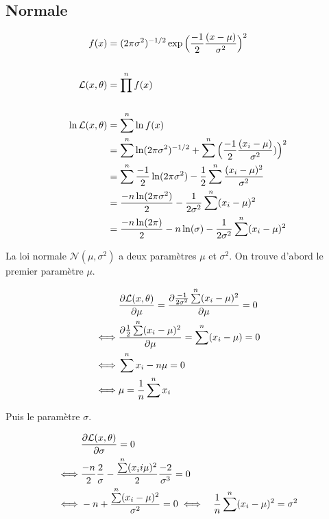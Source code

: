 \documentclass{article}
\begin{document}
\subsection{Normale}

\begin{align*}
        f(x) &= (2 \pi \sigma^2)^{-1/2} \exp\Big(\frac{-1}{2} \frac{(x-\mu)}{\sigma^2}\Big)^2 \\ \\
        {\cal L}(x, \theta) &= \prod\limits^n f(x) \\ \\
        \ln{\cal L}(x, \theta) &= \sum\limits^n \ln f(x) \\
        &= \sum\limits^n \ln(2 \pi \sigma^2)^{-1/2} + \sum\limits^n \Big(\frac{-1}{2} \frac{(x_i-\mu)}{\sigma^2})\Big)^2 \\
        &= \sum\limits^n \frac{- 1}{2} \ln(2 \pi \sigma^2) - \frac{1}{2} \sum\limits^n \frac{(x_i -\mu)^2}{\sigma^2} \\
        &= \frac{-n \ln(2 \pi \sigma^2)}{2} - \frac{1}{2 \sigma^2} \sum\limits^n (x_i - \mu)^2 \\
        &= \frac{-n \ln(2 \pi)}{2} - {n \ln(\sigma)} - \frac{1}{2 \sigma^2} \sum\limits^n (x_i - \mu)^2
\end{align*}

La loi normale $\mathcal{N}(\mu, \sigma^2)$ a deux paramètres $\mu$ et $\sigma^2$.
On trouve d'abord le premier paramètre $\mu$.

\begin{align*}
    &\frac{\partial \likelihood(x, \theta)}{\partial \mu} = \frac{\partial \frac{-1}{2 \sigma^2} \sum\limits^n (x_i - \mu)^2}{\partial \mu} = 0 \\
    \iff& \frac{\partial \frac{1}{2}\sum\limits^n (x_i-\mu)^2}{\partial \mu} = \sum\limits^n (x_i - \mu) = 0 \\
    \iff& \sum\limits^n x_i - n\mu = 0 \\
    \iff& \mu = \frac{1}{n} \sum\limits^n x_i
\end{align*}

Puis le paramètre $\sigma$.

\begin{align*}
    &\frac{\partial {\cal L}(x, \theta)}{\partial \sigma} = 0 \\
    \iff& \frac{-n}{2} \frac{2}{\sigma} - \frac{\sum\limits^n (x_i i \mu)^2}{2} \frac{-2}{\sigma^3}  = 0\\
    \iff& -n + \frac{\sum\limits^n (x_i - \mu)^2}{\sigma^2} = 0
    \iff& \frac{1}{n} \sum\limits^n (x_i - \mu)^2 = \sigma^2
\end{align*}
\end{document}
